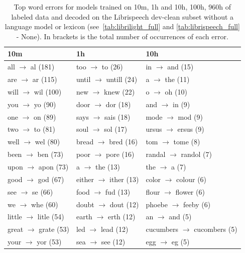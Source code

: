 \documentclass{article}
\begin{document}
\begin{table}
\caption{%
Top word errors for models trained on 10m, 1h and 10h, 100h, 960h of labeled data and decoded on the Librispeech dev-clean subset without a language model or lexicon (see~\autoref{tab:librilight_full} and \autoref{tab:librispeech_full} - None). In brackets is the total number of occurrences of each error.
}
\label{tbl:errors}
\centering 
\begin{tabular}{l|l|l}
\toprule
10m \wvppbig{} \voxsz{} & 1h \wvppbig{} \voxsz{} & 10h \wvppbig{} \voxsz{} \\
\midrule
all $\rightarrow$ al (181) &too $\rightarrow$ to (26) &in $\rightarrow$ and (15) \\
are $\rightarrow$ ar (115) &until $\rightarrow$ untill (24) &a $\rightarrow$ the (11) \\
will $\rightarrow$ wil (100) &new $\rightarrow$ knew (22) &o $\rightarrow$ oh (10) \\
you $\rightarrow$ yo (90) &door $\rightarrow$ dor (18) &and $\rightarrow$ in (9) \\
one $\rightarrow$ on (89) &says $\rightarrow$ sais (18) &mode $\rightarrow$ mod (9) \\
two $\rightarrow$ to (81) &soul $\rightarrow$ sol (17) &ursus $\rightarrow$ ersus (9) \\
well $\rightarrow$ wel (80) &bread $\rightarrow$ bred (16) &tom $\rightarrow$ tome (8) \\
been $\rightarrow$ ben (73) &poor $\rightarrow$ pore (16) &randal $\rightarrow$ randol (7) \\
upon $\rightarrow$ apon (73) &a $\rightarrow$ the (13) &the $\rightarrow$ a (7) \\
good $\rightarrow$ god (67) &either $\rightarrow$ ither (13) &color $\rightarrow$ colour (6) \\
see $\rightarrow$ se (66) &food $\rightarrow$ fud (13) &flour $\rightarrow$ flower (6) \\
we $\rightarrow$ whe (60) &doubt $\rightarrow$ dout (12) &phoebe $\rightarrow$ feeby (6) \\
little $\rightarrow$ litle (54) &earth $\rightarrow$ erth (12) &an $\rightarrow$ and (5) \\
great $\rightarrow$ grate (53) &led $\rightarrow$ lead (12) &cucumbers $\rightarrow$ cucombers (5) \\
your $\rightarrow$ yor (53) &sea $\rightarrow$ see (12) &egg $\rightarrow$ eg (5) \\

\end{tabular}
\end{table}
\end{document}
